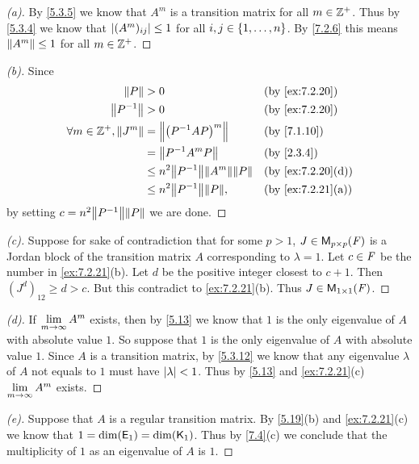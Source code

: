 \begin{proof}[(a)]
  By \cref{5.3.5} we know that \(A^m\) is a transition matrix for all \(m \in \mathbb{Z}^+\).
  Thus by \cref{5.3.4} we know that \(\left\lvert(A^m)_{i j}\right\rvert \leq 1\) for all \(i, j \in \left\lbrace1, \dots, n\right\rbrace\).
  By \cref{7.2.6} this means \(\left\lVert A^m\right\rVert \leq 1\) for all \(m \in \mathbb{Z}^+\).
\end{proof}

\begin{proof}[(b)]
  Since
  \begin{align*}
    \norm{P}                       & > 0                                        &  & \by{ex:7.2.20}    \\
    \norm{P^{-1}}                  & > 0                                        &  & \by{ex:7.2.20}    \\
    \forall m \in \Z^+, \norm{J^m} & = \norm{\pa{P^{-1} A P}^m}                 &  & \by{7.1.10}       \\
                                   & = \norm{P^{-1} A^m P}                      &  & \by{2.3.4}        \\
                                   & \leq n^2 \norm{P^{-1}} \norm{A^m} \norm{P} &  & \by{ex:7.2.20}[d] \\
                                   & \leq n^2 \norm{P^{-1}} \norm{P},           &  & \by{ex:7.2.21}[a]
  \end{align*}
  by setting \(c = n^2 \norm{P^{-1}} \norm{P}\) we are done.
\end{proof}

\begin{proof}[(c)]
  Suppose for sake of contradiction that for some \(p > 1\), \(J \in \ms[p][p][\F]\) is a Jordan block of the transition matrix \(A\) corresponding to \(\lambda = 1\).
  Let \(c \in \mathit{F}\) be the number in \cref{ex:7.2.21}(b).
  Let \(d\) be the positive integer closest to \(c + 1\).
  Then \((J^d)_{1 2} \geq d > c\).
  But this contradict to \cref{ex:7.2.21}(b).
  Thus \(J \in \ms[1][1][\F]\).
\end{proof}

\begin{proof}[(d)]
  If \(\lim\limits_{m \to \infty} A^m\) exists, then by \cref{5.13} we know that \(1\) is the only eigenvalue of \(A\) with absolute value \(1\).
  So suppose that \(1\) is the only eigenvalue of \(A\) with absolute value \(1\).
  Since \(A\) is a transition matrix, by \cref{5.3.12} we know that any eigenvalue \(\lambda\) of \(A\) not equals to \(1\) must have \(\left\lvert\lambda\right\rvert < 1\).
  Thus by \cref{5.13} and \cref{ex:7.2.21}(c) \(\lim\limits_{m \to \infty} A^m\) exists.
\end{proof}

\begin{proof}[(e)]
  Suppose that \(A\) is a regular transition matrix.
  By \cref{5.19}(b) and \cref{ex:7.2.21}(c) we know that \(1 = \dim(\mathsf{E}_1) = \dim(\mathsf{K}_1)\).
  Thus by \cref{7.4}(c) we conclude that the multiplicity of \(1\) as an eigenvalue of \(A\) is \(1\).
\end{proof}
